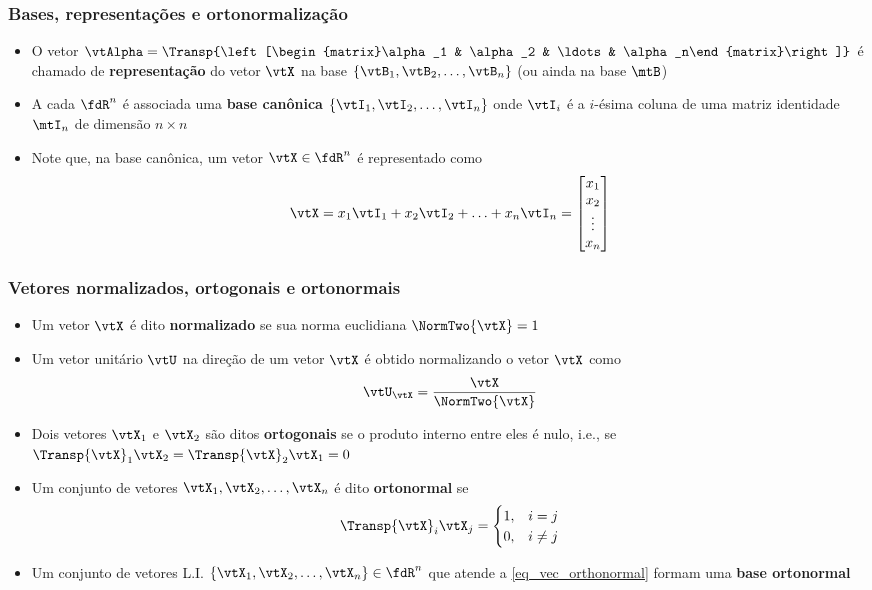 \begin{frame}
  \frametitle{Bases, representações e ortonormalização}
  \begin{itemize}
    \item O vetor $\vtAlpha = \Transp{\left[\begin{matrix}\alpha_1 & \alpha_2 & \ldots & \alpha_n\end{matrix}\right]}$ é chamado de \textbf{\alert{representação}} do vetor $\vtX$ na base $\left\{\vtB_1, \vtB_2, \ldots, \vtB_n\right\}$ (ou ainda na base $\mtB$)
    \item A cada $\fdR^n$ é associada uma \textbf{\alert{base canônica}} $\left\{\vtI_1, \vtI_2, \ldots, \vtI_n\right\}$ onde $\vtI_i$ é a $i$-ésima coluna de uma matriz identidade $\mtI_n$ de dimensão $n \times n$
    \item Note que, na base canônica, um vetor $\vtX \in \fdR^n$ é representado como
    \begin{equation}
      \vtX = x_1\vtI_1+x_2\vtI_2+\ldots+x_n\vtI_n = \left[\begin{matrix}x_1 \\ x_2 \\ \vdots \\ x_n\end{matrix}\right]
    \end{equation}
  \end{itemize}
\end{frame}

\begin{frame}
  \frametitle{Vetores normalizados, ortogonais e ortonormais}
  \begin{itemize}
    \item Um vetor $\vtX$ é dito \textbf{\alert{normalizado}} se sua norma euclidiana $\NormTwo{\vtX} = 1$
    \item Um vetor unitário $\vtU$ na direção de um vetor $\vtX$ é obtido normalizando o vetor $\vtX$ como
    \begin{equation}
      \vtU_{\vtX} = \frac{\vtX}{\NormTwo{\vtX}}
    \end{equation}
    \item Dois vetores $\vtX_1$ e $\vtX_2$ são ditos \textbf{\alert{ortogonais}} se o produto interno entre eles é nulo, i.e., se $\Transp{\vtX}_1\vtX_2 = \Transp{\vtX}_2\vtX_1 = 0$
    \item Um conjunto de vetores $\vtX_1, \vtX_2, \ldots, \vtX_n$ é dito \textbf{\alert{ortonormal}} se
    \begin{equation}\label{eq_vec_orthonormal}
      \Transp{\vtX}_i\vtX_j = \begin{cases}
        1, & i = j \\
        0, & i \neq j
      \end{cases}
    \end{equation}
    \item Um conjunto de vetores L.I. $\left\{\vtX_1, \vtX_2, \ldots, \vtX_n\right\} \in \fdR^n$ que atende a \eqref{eq_vec_orthonormal} formam uma \textbf{\alert{base ortonormal}}
  \end{itemize}
\end{frame}

